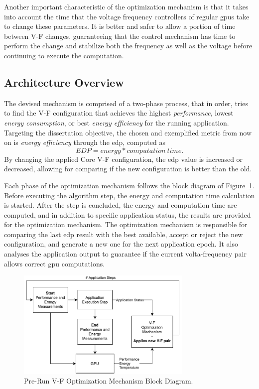 Another important characteristic of the optimization mechanism is that it takes into account the time that the voltage frequency controllers of regular \acrshort{gpu}s take to change these parameters. It is better and safer to allow a portion of time between V-F changes, guaranteeing that the control mechanism has time to perform the change and stabilize both the frequency as well as the voltage before continuing to execute the computation.


\subsection{Architecture Overview}

The devised mechanism is comprised of a two-phase process, that in order, tries to find the V-F configuration that achieves the highest \textit{performance}, lowest \textit{energy consumption}, or best \textit{energy efficiency} for the running application. Targeting the dissertation objective, the chosen and exemplified metric from now on is \textit{energy efficiency} through the \acrshort{edp}, computed as 
\begin{equation}
	EDP=energy * computation \: time.
	\label{eq:edp}
\end{equation}
By changing the applied Core V-F configuration, the \acrshort{edp} value is increased or decreased, allowing for comparing if the new configuration is better than the old. 

Each phase of the optimization mechanism follows the block diagram of Figure~\ref{fig:detail_mech}. Before executing the algorithm step, the energy and computation time calculation is started. After the step is concluded, the energy and computation time are computed, and in addition to specific application status, the results are provided for the optimization mechanism. The optimization mechanism is responsible for comparing the last \acrshort{edp} result with the best available, accept or reject the new configuration, and generate a new one for the next application epoch. It also analyses the application output to guarantee if the current volta-frequency pair allows correct \acrshort{gpu} computations.

\begin{figure}[htb]
  \centering
  \includegraphics[width=0.75\textwidth]{Figures/Optimization/opt_pre_run.pdf}
  \caption{Pre-Run V-F Optimization Mechanism Block Diagram.}
  \label{fig:detail_mech}
\end{figure}

